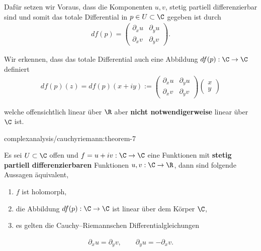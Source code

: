 \documentclass[letterpaper,10pt,german]{jupyterBook}
\begin{document}
\par
Dafür setzen wir Voraus, dass die Komponenten \(u,v\), stetig partiell differenzierbar sind und somit das totale Differential in \(p\in U\subset\C\) gegeben ist durch
\begin{align*}
df(p) = 
\begin{pmatrix} 
\partial_x u &\partial_y u\\
\partial_x v &\partial_y v
\end{pmatrix}.
\end{align*}
\par
Wir erkennen, dass das totale Differential auch eine Abbildung \(df(p):\C\to\C\) definiert
\begin{align*}
df(p)(z)= df(p)(x+iy):= 
\begin{pmatrix} 
\partial_x u &\partial_y u\\
\partial_x v &\partial_y v
\end{pmatrix}
\begin{pmatrix}
x\\y
\end{pmatrix}
\end{align*}
\par
welche offensichtlich linear über \(\R\) aber \textbf{nicht notwendigerweise} linear über \(\C\) ist.
\begin{theorem}{}{complexanalysis/cauchyriemann:theorem-7}



\par
Es sei \(U\subset \C\) offen und \(f=u+iv:\C\to\C\) eine Funktionen mit \textbf{stetig partiell differenzierbaren} Funktionen \(u,v:\C\to\R\), dann sind folgende Aussagen äquivalent,
\begin{enumerate}

\item {} 
\par
\(f\) ist holomorph,

\item {} 
\par
die Abbildung \(df(p):\C\to\C\) ist linear über dem Körper \(\C\),

\item {} 
\par
es gelten die Cauchy–Riemannschen Differentialgleichungen

\end{enumerate}
\begin{align*}
\partial_x u = \partial_y v, \qquad \partial_y u = -\partial_x v.
\end{align*}\end{theorem}
\end{document}
